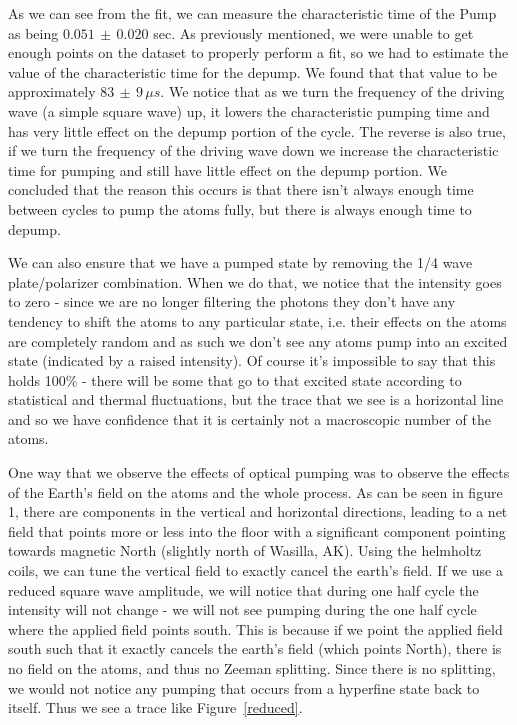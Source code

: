 \documentclass{article}
\begin{document}
    As we can see from the fit, we can measure the characteristic time of the Pump as being $0.051 \, \pm \, 0.020$ sec.  As previously mentioned, we were unable to get enough points on the dataset to properly perform a fit, so we had to estimate the value of the characteristic time for the depump.  We found that that value to be approximately $83 \, \pm \, 9 \, \mu s$.  We notice that as we turn the frequency of the driving wave (a simple square wave) up, it lowers the characteristic pumping time and has very little effect on the depump portion of the cycle.  The reverse is also true, if we turn the frequency of the driving wave down we increase the characteristic time for pumping and still have little effect on the depump portion.  We concluded that the reason this occurs is that there isn't always enough time between cycles to pump the atoms fully, but there is always enough time to depump.

    \hspace{.25cm}

    We can also ensure that we have a pumped state by removing the 1/4 wave plate/polarizer combination.  When we do that, we notice that the intensity goes to zero - since we are no longer filtering the photons they don't have any tendency to shift the atoms to any particular state, i.e. their effects on the atoms are completely random and as such we don't see any atoms pump into an excited state (indicated by a raised intensity).  Of course it's impossible to say that this holds 100\% - there will be some that go to that excited state according to statistical and thermal fluctuations, but the trace that we see is a horizontal line and so we have confidence that it is certainly not a macroscopic number of the atoms.

    \hspace{.25cm}

    One way that we observe the effects of optical pumping was to observe the effects of the Earth's field on the atoms and the whole process.  As can be seen in figure 1, there are components in the vertical and horizontal directions, leading to a net field that points more or less into the floor with a significant component pointing towards magnetic North (slightly north of Wasilla, AK).  Using the helmholtz coils, we can tune the vertical field to exactly cancel the earth's field.  If we use a reduced square wave amplitude, we will notice that during one half cycle the intensity will not change - we will not see pumping during the one half cycle where the applied field points south.  This is because if we point the applied field south such that it exactly cancels the earth's field (which points North), there is no field on the atoms, and thus no Zeeman splitting.  Since there is no splitting, we would not notice any pumping that occurs from a hyperfine state back to itself.  Thus we see a trace like Figure~\ref{reduced}.
\end{document}
